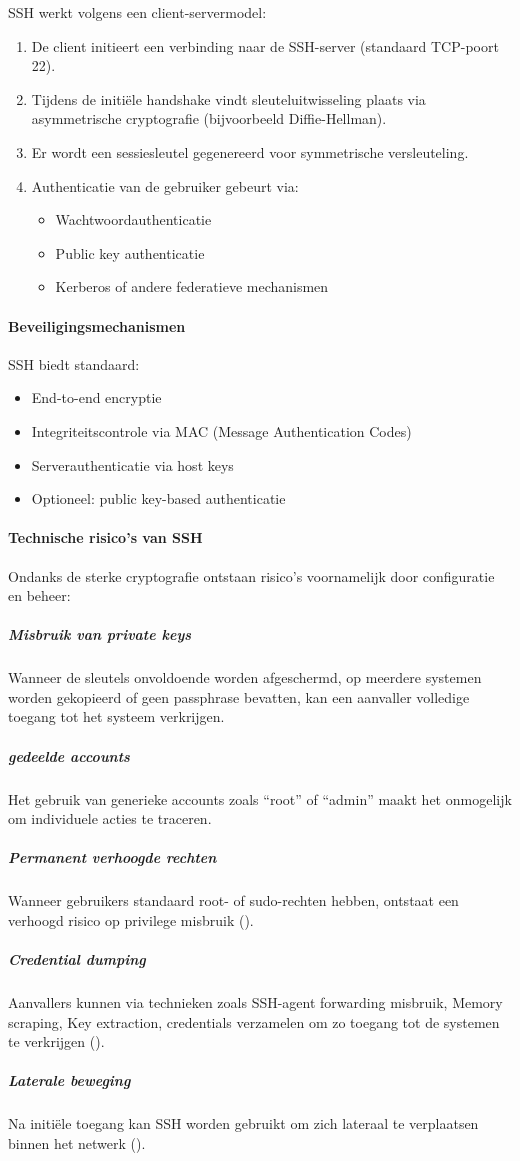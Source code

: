 SSH werkt volgens een client-servermodel:
\begin{enumerate}
	\item De client initieert een verbinding naar de SSH-server (standaard TCP-poort 22).
	\item Tijdens de initiële handshake vindt sleuteluitwisseling plaats via asymmetrische cryptografie (bijvoorbeeld Diffie-Hellman).
	\item Er wordt een sessiesleutel gegenereerd voor symmetrische versleuteling.
	\item Authenticatie van de gebruiker gebeurt via:
	\begin{itemize}
		\item Wachtwoordauthenticatie
		\item Public key authenticatie
		\item Kerberos of andere federatieve mechanismen
	\end{itemize}
\end{enumerate}
\paragraph{Beveiligingsmechanismen}
SSH biedt standaard:
\begin{itemize}
	\item End-to-end encryptie
	\item Integriteitscontrole via MAC (Message Authentication Codes)
	\item Serverauthenticatie via host keys
	\item Optioneel: public key-based authenticatie
\end{itemize}
\paragraph{Technische risico’s van SSH}
Ondanks de sterke cryptografie ontstaan risico’s voornamelijk door configuratie en beheer:
\subparagraph{Misbruik van private keys}
Wanneer de sleutels onvoldoende worden afgeschermd, op meerdere systemen worden gekopieerd of geen passphrase bevatten, kan een aanvaller volledige toegang tot het systeem verkrijgen.
\subparagraph{gedeelde accounts}
Het gebruik van generieke accounts zoals “root” of “admin” maakt het onmogelijk om individuele acties te traceren.
\subparagraph{Permanent verhoogde rechten}
Wanneer gebruikers standaard root- of sudo-rechten hebben, ontstaat een verhoogd risico op privilege misbruik (\cite{nist_zta_800_207}).
\subparagraph{Credential dumping}
Aanvallers kunnen via technieken zoals SSH-agent forwarding misbruik, Memory scraping, Key extraction, credentials verzamelen om zo toegang tot de systemen te verkrijgen (\cite{mitre_t1003}).
\subparagraph{Laterale beweging}
Na initiële toegang kan SSH worden gebruikt om zich lateraal te verplaatsen binnen het netwerk (\cite{mitre_lateral_movement}).

